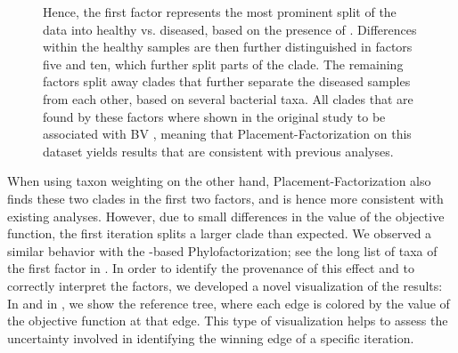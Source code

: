 \begin{figure}[!htbp]
{        Hence, the first factor represents the most prominent split of the data into healthy vs. diseased,
        based on the presence of .
        Differences within the healthy samples are then further distinguished in factors five and ten,
        which further split parts of the  clade.
        The remaining factors split away clades that further separate the diseased samples from each other,
        based on several bacterial taxa.
        All clades that are found by these factors
        where shown in the original study to be associated with \ac{BV} \cite{Srinivasan2012},
        meaning that Placement-Factorization on this dataset yields results that are consistent with previous analyses.
    }
    \label{supp:fig:factors_tree}
\end{figure}

When using taxon weighting on the other hand, Placement-Factorization also finds these two clades in the first two factors,
and is hence more consistent with existing analyses.
However, due to small differences in the value of the objective function,
the first iteration splits a larger clade than expected.
We observed a similar behavior with the -based Phylofactorization;
see the long list of taxa of the first factor in .
In order to identify the provenance of this effect and to correctly interpret the factors,
we developed a novel visualization of the results:
In  and in , we show the reference tree,
where each edge is colored by the value of the objective function at that edge.
This type of visualization helps to assess the uncertainty involved in identifying the winning edge of a specific iteration.

